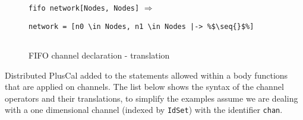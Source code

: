 \FloatBarrier
\begin{figure}[!h]
\lstinline|fifo network[Nodes, Nodes]| $\Rightarrow$ 
\begin{lstlisting}[escapechar=\%, frame = none, numbers = none]
network = [n0 \in Nodes, n1 \in Nodes |-> %$\seq{}$%]
  
\end{lstlisting}  
\caption{FIFO channel declaration - \tlaplus translation}
\label{fifochannels}
\end{figure}
\FloatBarrier

Distributed PlusCal added to the statements allowed within a body functions that are applied on channels.
The list below shows the syntax of the channel operators and their \tlaplus translations, to simplify the examples assume we are dealing with a one dimensional channel (indexed by \verb|IdSet|) with the identifier \verb|chan|.

